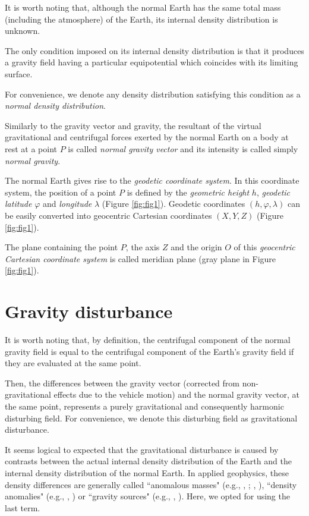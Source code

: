 \documentclass[manuscript]{geophysics}
\begin{document}
It is worth noting that, although the normal Earth has the
same total mass (including the atmosphere) of the Earth,
its internal density distribution is unknown.


The only condition imposed on its internal density
distribution is that it produces a gravity field
having a particular equipotential which coincides
with its limiting surface.


For convenience, we denote any density distribution 
satisfying this condition as a \textit{normal density distribution}.


Similarly to the gravity vector and gravity, 
the resultant of the virtual 
gravitational and centrifugal forces exerted by the normal
Earth on a body at rest at a point $P$ is called 
\textit{normal gravity vector} and its intensity is called 
simply \textit{normal gravity}.


The normal Earth gives rise to the \textit{geodetic coordinate system}.
In this coordinate system, the position of a point $P$
is defined by the \textit{geometric height} $h$, 
\textit{geodetic latitude}
$\varphi$ and \textit{longitude} $\lambda$ (Figure \ref{fig:fig1}).
Geodetic coordinates $(h, \varphi, \lambda)$ can be easily 
converted into geocentric Cartesian coordinates $(X, Y, Z)$
(Figure \ref{fig:fig1}).


The plane containing the point $P$, the axis $Z$ and
the origin $O$ of this \textit{geocentric Cartesian coordinate system}
is called meridian plane (gray plane in Figure \ref{fig:fig1}).


\section{Gravity disturbance}


It is worth noting that, by definition, 
the centrifugal component of the normal gravity field is
equal to the centrifugal component of the Earth's gravity
field if they are evaluated at the same point.


Then, the differences between the gravity vector
(corrected from non-gravitational effects due to the vehicle motion) 
and the normal gravity vector, at the same point, represents a purely 
gravitational and consequently harmonic disturbing field.
For convenience, we denote this disturbing field as
gravitational disturbance.


It seems logical to expected that the gravitational disturbance 
is caused by contrasts between the actual internal 
density distribution of the Earth and the internal density 
distribution of the normal Earth.
In applied geophysics, these density differences are generally 
called ``anomalous masses" (e.g., \citeauthor{hammer1945}, 
\citeyear{hammer1945}; \citeauthor{lafehr1965}, \citeyear{lafehr1965}),
``density anomalies" (e.g., \citeauthor{forsberg1984}, \citeyear{forsberg1984})
or ``gravity sources" (e.g., \citeauthor{blakely1996}, 
\citeyear{blakely1996}). Here, we opted for using the last term.
\end{document}
